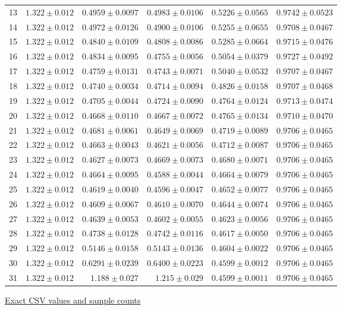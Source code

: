 \begin{center}
{\begin{tabular}{lrrrrr}
13 & $1.322\pm0.012$ & $0.4959\pm0.0097$ & $0.4983\pm0.0106$ & $0.5226\pm0.0565$ & $0.9742\pm0.0523$ \\
14 & $1.322\pm0.012$ & $0.4972\pm0.0126$ & $0.4900\pm0.0106$ & $0.5255\pm0.0655$ & $0.9708\pm0.0467$ \\
15 & $1.322\pm0.012$ & $0.4840\pm0.0109$ & $0.4808\pm0.0086$ & $0.5285\pm0.0664$ & $0.9715\pm0.0476$ \\
16 & $1.322\pm0.012$ & $0.4834\pm0.0095$ & $0.4755\pm0.0056$ & $0.5054\pm0.0379$ & $0.9727\pm0.0492$ \\
17 & $1.322\pm0.012$ & $0.4759\pm0.0131$ & $0.4743\pm0.0071$ & $0.5040\pm0.0532$ & $0.9707\pm0.0467$ \\
18 & $1.322\pm0.012$ & $0.4740\pm0.0034$ & $0.4714\pm0.0094$ & $0.4826\pm0.0158$ & $0.9707\pm0.0468$ \\
19 & $1.322\pm0.012$ & $0.4705\pm0.0044$ & $0.4724\pm0.0090$ & $0.4764\pm0.0124$ & $0.9713\pm0.0474$ \\
20 & $1.322\pm0.012$ & $0.4668\pm0.0110$ & $0.4667\pm0.0072$ & $0.4765\pm0.0134$ & $0.9710\pm0.0470$ \\
21 & $1.322\pm0.012$ & $0.4681\pm0.0061$ & $0.4649\pm0.0069$ & $0.4719\pm0.0089$ & $0.9706\pm0.0465$ \\
22 & $1.322\pm0.012$ & $0.4663\pm0.0043$ & $0.4621\pm0.0056$ & $0.4712\pm0.0087$ & $0.9706\pm0.0465$ \\
23 & $1.322\pm0.012$ & $0.4627\pm0.0073$ & $0.4669\pm0.0073$ & $0.4680\pm0.0071$ & $0.9706\pm0.0465$ \\
24 & $1.322\pm0.012$ & $0.4664\pm0.0095$ & $0.4588\pm0.0044$ & $0.4664\pm0.0079$ & $0.9706\pm0.0465$ \\
25 & $1.322\pm0.012$ & $0.4619\pm0.0040$ & $0.4596\pm0.0047$ & $0.4652\pm0.0077$ & $0.9706\pm0.0465$ \\
26 & $1.322\pm0.012$ & $0.4609\pm0.0067$ & $0.4610\pm0.0070$ & $0.4644\pm0.0074$ & $0.9706\pm0.0465$ \\
27 & $1.322\pm0.012$ & $0.4639\pm0.0053$ & $0.4602\pm0.0055$ & $0.4623\pm0.0056$ & $0.9706\pm0.0465$ \\
28 & $1.322\pm0.012$ & $0.4738\pm0.0128$ & $0.4742\pm0.0116$ & $0.4617\pm0.0050$ & $0.9706\pm0.0465$ \\
29 & $1.322\pm0.012$ & $0.5146\pm0.0158$ & $0.5143\pm0.0136$ & $0.4604\pm0.0022$ & $0.9706\pm0.0465$ \\
30 & $1.322\pm0.012$ & $0.6291\pm0.0239$ & $0.6400\pm0.0223$ & $0.4599\pm0.0012$ & $0.9706\pm0.0465$ \\
31 & $1.322\pm0.012$ & $1.188\pm0.027$ & $1.215\pm0.029$ & $0.4599\pm0.0011$ & $0.9706\pm0.0465$ \\
\bottomrule\end{tabular}}
{\footnotesize\href{https://github.com/sanjeevkrishnaa/Compiler-Driven-ACE/blob/codex/ace-scheduler-correctness/docs/latex/qft96_final/data/allocation_mesh_max_reliability_m32.csv}{Exact CSV values and sample counts}}
\end{center}
